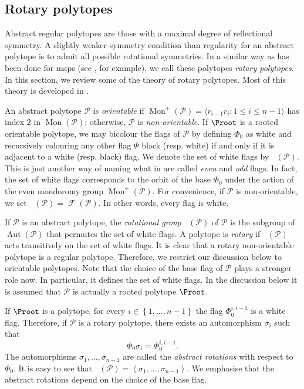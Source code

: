 \documentclass[final]{amsart}
\theoremstyle{plain}
\theoremstyle{definition}
\theoremstyle{remark}
\numberwithin{equation}{section}
\renewcommand{\leq}{\leqslant} \renewcommand{\geq}{\geqslant}
\renewcommand{\{}{\lbrace}
\renewcommand{\}}{\rbrace}
\newcommand{\cP}{\mathcal{P}}
\DeclareMathOperator{\aut}{Aut} \DeclareMathOperator{\autp}{\aut^{+}}
\DeclareMathOperator{\fl}{\mathcal{F}}
\DeclareMathOperator{\Fw}{\mathcal{F}^{w}}
\DeclareMathOperator{\mon}{Mon}
\newcommand{\baseFlag}{\Phi_{0}}
\begin{document}
\subsection{Rotary polytopes} \label{sec:rotary}

Abstract regular polytopes are those with a maximal degree of reflectional symmetry. 
A slightly weaker symmetry condition than regularity for an abstract polytope is to admit all possible rotational symmetries.
In a similar way as has been done for maps (see \cite{Wilson_1978_RiemannSurfacesOver}, for example), we call these polytopes \emph{rotary polytopes}. 
In this section, we review some of the theory of rotary polytopes.
Most of this theory is developed in \cite{SchulteWeiss_1991_ChiralPolytopes}.

An abstract polytope $\cP$ is \emph{orientable} if $\mon^+(\cP) = \langle r_{i-1}r_{i} : 1 \leq i \leq n-1 \rangle$ has index $2$ in $\mon(\cP)$;
otherwise, $\cP$ is \emph{non-orientable}.
If $\Proot$ is a rooted orientable polytope, we may bicolour the flags of $\cP$ by defining $\baseFlag$ as white and recursively colouring any other flag $\Psi$  black (resp. white) if and only if it is adjacent to a white (resp. black) flag.
We denote the set of white flags by $\Fw(\cP)$.
This is just another way of naming what in \cite{SchulteWeiss_1991_ChiralPolytopes} are called \emph{even} and \emph{odd} flags. In fact, the set of white flags corresponds to the orbit of the base $\Phi_0$ under the action of the even mondoromy group $\mon^+(\cP)$.
For convenience, if $\cP$ is non-orientable, we set  $\Fw(\cP) = \fl (\cP)$.
In other words, every flag is white. 


If $\cP$ is an abstract polytope, the \emph{rotational group} $\autp(\cP) $ of $\cP$ is the subgroup of $\aut(\cP)$ that permutes the set of white flags. 
A polytope is \emph{rotary} if $\autp(\cP)$ acts transitively on the set of white flags. 
It is clear that a rotary non-orientable polytope is a regular polytope. 
Therefore, we restrict our discussion below to orientable polytopes.
Note that the choice of the base flag of $\cP$ plays a stronger role now. 
In particular, it defines the set of white flags.
In the discussion below it is assumed that $\cP$ is actually a rooted polytope $\Proot$.

If $\Proot$ is a  polytope, for every $i \in \left\{ 1, \dots, n-1 \right\} $ the flag $\baseFlag^{i,i-1}$ is a white flag.
Therefore, if $\cP$ is a rotary polytope, there exists an automorphism $\sigma_{i}$ such that \[\baseFlag \sigma_{i} = \baseFlag^{i, i-1}.\]
The automorphisms $\sigma_{1}, \dots, \sigma_{n-1}$ are called the \emph{abstract rotations} with respect to $\baseFlag$.
It is easy to see that $\autp(\cP) = \left\langle \sigma_{1}, \dots, \sigma_{n-1} \right\rangle $. 
We emphasise that the abstract rotations depend on the choice of the base flag.
\end{document}
